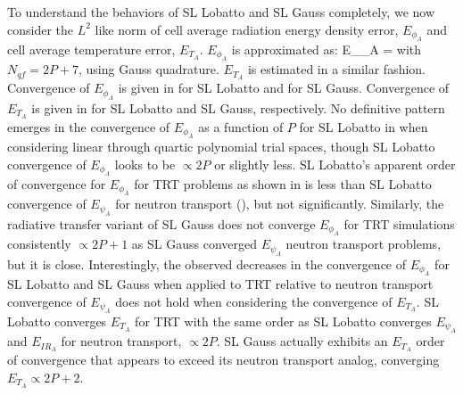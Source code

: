 To understand the behaviors of SL Lobatto and SL Gauss completely, we now consider the $L^2$ like norm of cell average radiation energy density error, $E_{\phi_A}$ and cell average temperature error, $E_{T_A}$.
$E_{\phi_A}$ is approximated as:
\benum
E_{\phi_A} =  \pec
\eenum
with $N_{qf} = 2P + 7$, using Gauss quadrature.  $E_{T_A}$ is estimated in a similar fashion.
Convergence of $E_{\phi_A}$ is given in  for SL Lobatto and  for SL Gauss.
Convergence of $E_{T_A}$ is given in  for SL Lobatto and SL Gauss, respectively.
No definitive pattern emerges in the convergence of $E_{\phi_A}$ as a function of $P$ for SL Lobatto in  when considering linear through quartic polynomial trial spaces, though SL Lobatto convergence of $E_{\phi_A}$ looks to be $\propto 2P$ or slightly less.
SL Lobatto's apparent order of convergence for $E_{\phi_A}$ for TRT problems as shown in  is less than SL Lobatto convergence of $E_{\psi_A}$ for neutron transport (), but not significantly. 
Similarly, the radiative transfer variant of SL Gauss does not converge $E_{\phi_A}$ for TRT simulations consistently $\propto 2P+1$ as SL Gauss converged $E_{\psi_A}$ neutron transport problems,
but it is close.  
Interestingly, the observed decreases in the convergence of $E_{\phi_A}$ for SL Lobatto and SL Gauss when applied to TRT relative to neutron transport convergence of $E_{\psi_A}$ does not hold when considering the convergence of $E_{T_A}$.  
SL Lobatto converges $E_{T_A}$ for TRT with the same order as SL Lobatto converges $E_{\psi_A}$ and $E_{IR_A}$ for neutron transport, $\propto 2P$.
SL Gauss actually exhibits an $E_{T_A}$ order of convergence that appears to exceed its neutron transport analog, converging $E_{T_A} \propto 2P+2$. \


